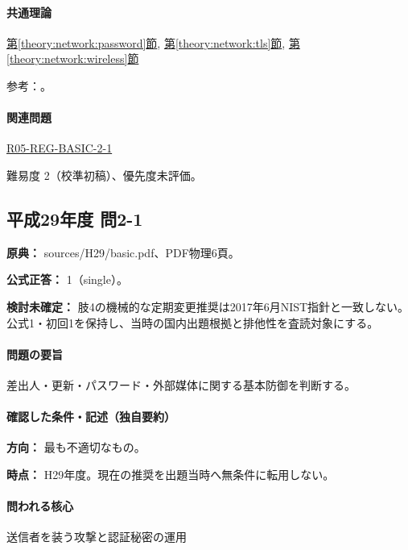 \paragraph{共通理論} \hyperref[theory:network:password]{第\ref*{theory:network:password}節}, \hyperref[theory:network:tls]{第\ref*{theory:network:tls}節}, \hyperref[theory:network:wireless]{第\ref*{theory:network:wireless}節}

\par 参考：\cite{net_nist2017,net_nist2025,net_wep}。

\paragraph{関連問題} \hyperref[q:r05-reg-basic-2-1]{R05-REG-BASIC-2-1}

\par 難易度 2（校準初稿）、優先度未評価。

\subsection{平成29年度 問2-1}
\label{q:h29-reg-basic-2-1}

\noindent\textbf{原典：} sources/H29/basic.pdf、PDF物理6頁。

\textbf{公式正答：} 1（single）。

\par\textbf{検討未確定：} 肢4の機械的な定期変更推奨は2017年6月NIST指針と一致しない。公式1・初回1を保持し、当時の国内出題根拠と排他性を査読対象にする。

\paragraph{問題の要旨} 差出人・更新・パスワード・外部媒体に関する基本防御を判断する。

\paragraph{確認した条件・記述（独自要約）}\mbox{}\par

\noindent\textbf{方向：} 最も不適切なもの。\par

\noindent\textbf{時点：} H29年度。現在の推奨を出題当時へ無条件に転用しない。\par

\paragraph{問われる核心} 送信者を装う攻撃と認証秘密の運用

